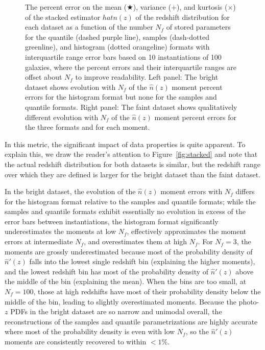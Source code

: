 \documentclass[\docopts]{\docclass}
\newcommand{\pz}{photo-$z$ PDF}
\newcommand{\mgdata}{bright\xspace}
\newcommand{\ssdata}{faint\xspace}
\begin{document}
\begin{figure}
\begin{center}
    \caption{
    The percent error on the mean ($\bigstar$), variance ($+$), and kurtosis 
($\times$) of the stacked estimator $hat{n}(z)$ of the redshift distribution 
for each dataset as a function of the number $N_{f}$ of stored parameters for 
the quantile (dashed purple line), samples (dash-dotted greenline), and 
histogram (dotted orangeline) formats with interquartile range error bars based 
on 10 instantiations of 100 galaxies, where the percent errors and their 
interquartile ranges are offset about $N_{f}$ to improve readability.
    Left panel: The \mgdata dataset shows evolution with $N_{f}$ of the 
$\hat{n}(z)$ moment percent errors for the histogram format but none for the 
samples and quantile formats.
    Right panel: The \ssdata dataset shows qualitatively different evolution 
with $N_{f}$ of the $\hat{n}(z)$ moment percent errors for the three formats 
and for each moment.
    \label{fig:nz_moment_errs}}
  \end{center}
\end{figure}
In this metric, the significant impact of data properties is quite apparent.
To explain this, we draw the reader's attention to Figure~\ref{fig:stacked} and 
note that the actual redshift distribution for both datasets is similar, but 
the redshift range over which they are defined is larger for the \mgdata 
dataset than the \ssdata dataset.

In the \mgdata dataset, the evolution of the $\hat{n}(z)$ moment errors with 
$N_{f}$ differs for the histogram format relative to the samples and quantile 
formats; while the samples and quantile formats exhibit essentially no 
evolution in excess of the error bars between instantiations, the histogram 
format significantly underestimates the moments at low $N_{f}$, effectively 
approximates the moment errors at intermediate $N_{f}$, and overestimates them 
at high $N_{f}$.
For $N_{f}=3$, the moments are grossly underestimated because most of the 
probability density of $\hat{n}'(z)$ falls into the lowest single redshift bin 
(explaining the higher moments), and the lowest redshift bin has most of the 
probability density of $\hat{n}'(z)$ above the middle of the bin (explaining 
the mean).
When the bins are too small, at $N_{f}=100$, those at high redshifts have most 
of their probability density below the middle of the bin, leading to slightly 
overestimated moments.
Because the \pz s in the \mgdata dataset are so narrow and unimodal overall, 
the reconstructions of the samples and quantile parametrizations are highly 
accurate where most of the probability density is even with low $N_{f}$, so the 
$\hat{n}'(z)$ moments are consistently recovered to within $<1\%$.
\end{document}

